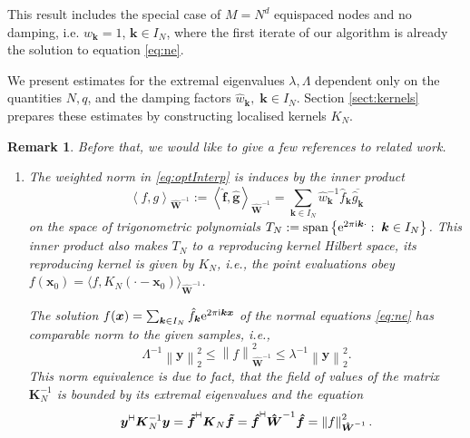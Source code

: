 \documentclass[11pt,a4paper,bibtotoc]{scrartcl}
\def\ti{\mbox{\scriptsize{\rm i}}}
\newcommand{\eip}[1]{{\rm e}^{ 2\pi{\ti} #1}}
\newcommand{\zb}[1]{\ensuremath{\boldsymbol{#1}}}
\newcommand{\adj}{{\vdash \hspace*{-1.72mm} \dashv}}
\renewcommand{\span}{{\rm span}}
\newcommand{\indexset}{{I_N}}
\newtheorem{remark}[theorem]{Remark}
\newenvironment{Remark}{\goodbreak \begin{remark}\rm}{\end{remark}}
\numberwithin{equation}{section}
\numberwithin{table}{section}
\numberwithin{figure}{section}
\begin{document}
This result includes the special case of $M=N^d$ equispaced nodes and no
damping, i.e. $w_{\zb k}=1$, $\zb k \in I_N$, where the first iterate of our
algorithm is already the solution to equation \eqref{eq:ne}.

We present estimates for the extremal eigenvalues $\lambda,\Lambda$ dependent
only on the quantities $N,q$, and the damping factors $\hat w_{\zb k},\; \zb k
\in \indexset$.
Section \ref{sect:kernels} prepares these estimates by constructing localised
kernels $K_N$.

\begin{Remark}\label{remark:ref}
Before that, we would like to give a few references to related work.
\begin{enumerate}
\item The weighted norm in \eqref{eq:optInterp} is induces by the inner
  product
  \begin{equation*}
    \left\langle f,g\right\rangle_{\zb {\hat W}^{-1}}:=\left\langle \zb {\hat
        f}, \zb {\hat g}\right\rangle_{\zb {\hat W}^{-1}}=\sum\limits_{\zb
        k\in I_N} \hat w_{\zb k}^{-1} \hat f_{\zb k} \overline{\hat g_{\zb k}}
  \end{equation*}
  on the space of trigonometric polynomials $T_N:=\span\left\{\eip{\zb k
      \cdot}:\;\zb k \in \indexset\right\}$.
  This inner product also makes $T_N$ to a reproducing kernel Hilbert space,
  its reproducing kernel is given by $K_N$, i.e., the point evaluations
  obey $f(\zb x_0) = \langle f,K_N(\cdot - \zb x_0)\rangle_{\zb {\hat
      W}^{-1}}$.

  The solution $f(\zb x)=\sum_{\zb k \in \indexset} \hat f_{\zb k} \eip{\zb k
  \zb x}$ of the normal equations \eqref{eq:ne} has comparable norm to the
  given samples, i.e.,
  \begin{equation*}
    \Lambda^{-1}\left\|\zb y\right\|_2^2 \le \left\|f\right\|_{\zb {\hat
    W}^{-1}}^2 \le \lambda^{-1}\left\|\zb y\right\|_2^2.
  \end{equation*}
  This norm equivalence is due to fact, that the field of values of the matrix
  $\zb K_N^{-1}$ is bounded by its extremal eigenvalues and the equation
  \begin{equation*}
    \zb y^{\adj} \zb K_N^{-1} \zb y
    = \zb {\tilde f}^{\adj} \zb K_N \zb {\tilde f}
    = \zb{\hat f}^{\adj} \zb {\hat W}^{-1} \zb{\hat f}
    = \left\|f\right\|_{\zb {\hat W}^{-1}}^2. 
  \end{equation*}


\end{enumerate}
\end{Remark}
\end{document}
